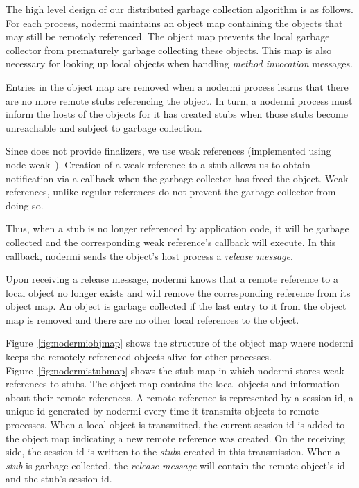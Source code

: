 The high level design of our distributed garbage collection
algorithm is as follows.
For each process, nodermi maintains an object map containing the objects
that may still be remotely referenced.
The object map prevents the local garbage collector from prematurely garbage collecting
these objects.
This map is also necessary for looking up local objects
when handling \emph{method invocation} messages.

Entries in the object map are removed when a nodermi process learns that there
are no more remote stubs referencing the object.   In turn, a nodermi
process must inform the hosts of the objects for it has created stubs
when those stubs become unreachable and subject to garbage collection.

Since \js does not provide finalizers, we use weak
references (implemented using node-weak~\cite{nodeweak}).
Creation of a weak reference to a stub allows us to obtain notification
via a callback when the garbage collector has freed the object.  Weak
references, unlike regular references do not prevent the garbage collector
from doing so.

Thus, when a stub is no longer referenced by application code, it will
be garbage collected and the corresponding weak reference's callback
will execute.  In this callback, nodermi
sends the object's host process a \emph{release message}.

Upon receiving a release message, nodermi knows that a remote
reference to a local object no longer exists and will remove the
corresponding reference from its object map.
An object is garbage collected if the last entry to it from the
object map is removed and there are no other local references to the
object.

%
%

\nodermiobjmapfig{}
\nodermistubmapfig{}

Figure~\ref{fig:nodermiobjmap} shows the structure of the object
map where nodermi keeps the remotely referenced objects
alive for other processes.
Figure~\ref{fig:nodermistubmap} shows the stub map
in which nodermi stores weak references to stubs.
The object map contains the local objects and information about their
remote references.  A remote reference is represented by a session id, a
unique id generated by nodermi every time it transmits objects to remote
processes.  When a local object is transmitted, the current session id
is added to the object map indicating a new remote reference was created.
On the receiving side, the session id is written to the \emph{stub}s
created in this transmission.  When a \emph{stub} is garbage collected,
the \emph{release message} will contain the remote object's id and
the stub's session id.

